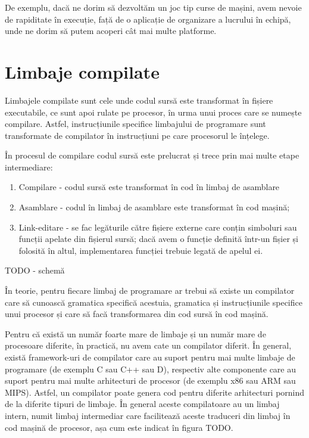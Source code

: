 De exemplu, dacă ne dorim să dezvoltăm un joc tip curse de mașini, avem nevoie
de rapiditate în execuție, față de o aplicație de organizare a lucrului în
echipă, unde ne dorim să putem acoperi cât mai multe platforme.

\section{Limbaje compilate}
\label{sec:appdev-langs-comp}

Limbajele compilate sunt cele unde codul sursă este transformat în fișiere
executabile, ce sunt apoi rulate pe procesor, în urma unui proces care se
numește compilare. Astfel, instrucțiunile specifice limbajului de programare
sunt transformate de compilator în instrucțiuni pe care procesorul le înțelege.

În procesul de compilare codul sursă este prelucrat și trece prin mai multe
etape intermediare:

\begin{enumerate}
	\item Compilare - codul sursă este transformat în cod în limbaj de
		asamblare
	\item Asamblare - codul în limbaj de asamblare este transformat în cod
		mașină;
	\item Link-editare - se fac legăturile către fișiere externe care conțin
		simboluri sau funcții apelate din fișierul sursă; dacă avem o
		funcție definită într-un fișier și folosită în altul,
		implementarea funcției trebuie legată de apelul ei.
\end{enumerate}

TODO - schemă

În teorie, pentru fiecare limbaj de programare ar trebui să existe un compilator
care să cunoască gramatica specifică acestuia, gramatica și instrucțiunile
specifice unui procesor și care să facă transformarea din cod sursă în cod
mașină.

Pentru că există un număr foarte mare de limbaje și un număr mare de procesoare
diferite, în practică, nu avem cate un compilator diferit. În general, există
framework-uri de compilator care au suport pentru mai multe limbaje de programare (de exemplu C sau C++ sau D), respectiv alte
componente care au suport pentru mai multe arhitecturi de procesor (de exemplu x86 sau ARM sau MIPS). Astfel, un compilator poate genera cod pentru diferite arhitecturi pornind de la diferite tipuri de limbaje. În general aceste compilatoare au un limbaj intern, numit limbaj intermediar care facilitează aceste traduceri din limbaj în cod mașină de procesor, așa cum este indicat în figura TODO.

